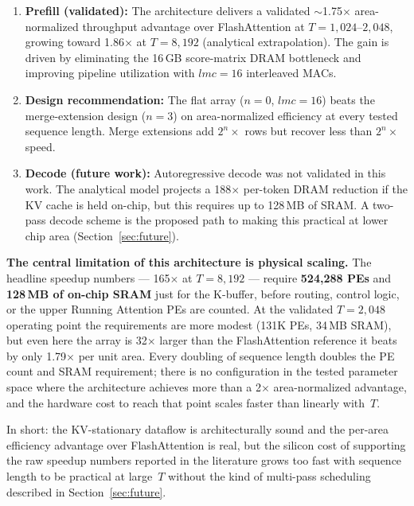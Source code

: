 \documentclass[11pt]{article}
\begin{document}
\begin{enumerate}[noitemsep]
    \item \textbf{Prefill (validated):} The architecture delivers a
          validated \(\sim\)1.75$\times$ area-normalized throughput
          advantage over FlashAttention at \(T = 1{,}024\)--\(2{,}048\),
          growing toward 1.86$\times$ at \(T = 8{,}192\)
          (analytical extrapolation).
          The gain is driven by eliminating the 16\,GB score-matrix
          DRAM bottleneck and improving pipeline utilization with
          \(lmc = 16\) interleaved MACs.

    \item \textbf{Design recommendation:} The flat array
          (\(n = 0\), \(lmc = 16\)) beats the merge-extension design
          (\(n = 3\)) on area-normalized efficiency at every tested
          sequence length.
          Merge extensions add \(2^n\times\) rows but recover less
          than \(2^n\times\) speed.

    \item \textbf{Decode (future work):} Autoregressive decode was not
          validated in this work.
          The analytical model projects a 188$\times$ per-token DRAM
          reduction if the KV cache is held on-chip, but this requires
          up to 128\,MB of SRAM.
          A two-pass decode scheme is the proposed path to making
          this practical at lower chip area (Section~\ref{sec:future}).
\end{enumerate}

\textbf{The central limitation of this architecture is physical scaling.}
The headline speedup numbers --- 165$\times$ at \(T = 8{,}192\) ---
require \textbf{524{,}288 PEs} and \textbf{128\,MB of on-chip SRAM}
just for the K-buffer, before routing, control logic, or the upper
Running Attention PEs are counted.
At the validated \(T = 2{,}048\) operating point the requirements
are more modest (131K PEs, 34\,MB SRAM), but even here the array
is 32$\times$ larger than the FlashAttention reference it beats
by only 1.79$\times$ per unit area.
Every doubling of sequence length doubles the PE count and
SRAM requirement; there is no configuration in the tested
parameter space where the architecture achieves more than
a 2$\times$ area-normalized advantage, and the hardware cost
to reach that point scales faster than linearly with~\(T\).

In short: the KV-stationary dataflow is architecturally sound
and the per-area efficiency advantage over FlashAttention is
real, but the silicon cost of supporting the raw speedup
numbers reported in the literature grows too fast with
sequence length to be practical at large~\(T\) without
the kind of multi-pass scheduling described in
Section~\ref{sec:future}.
\end{document}
